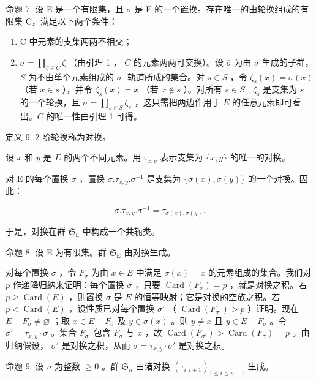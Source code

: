 命题 7. 设 E 是一个有限集，且 \(\sigma\) 是 E 的一个置换。存在唯一的由轮换组成的有限集 C，满足以下两个条件：

\begin{enumerate}
\def\labelenumi{(\alph{enumi})}
\item
  C 中元素的支集两两不相交；
\item
  \(\sigma = \prod_{\zeta \in C} \zeta\) （由引理 1 ， \(C\) 的元素两两可交换）。设 \(\bar{\sigma}\) 为由 \(\sigma\) 生成的子群， \(S\) 为不由单个元素组成的 \(\bar{\sigma}\) -轨道所成的集合。对 \(s \in S\) ，令 \(\zeta_s(x) = \sigma(x)\) （若 \(x \in s\) ），并令 \(\zeta_s(x) = x\) （若 \(x \notin s\) ）。对所有 \(s \in S\) , \(\zeta_s\) 是支集为 \(s\) 的一个轮换，且 \(\sigma = \prod_{s \in S} \zeta_s\) ，这只需把两边作用于 \(E\) 的任意元素即可看出。\(C\) 的唯一性由引理 1 可得。
\end{enumerate}

定义 9. 2 阶轮换称为对换。

设 \(x\) 和 \(y\) 是 \(E\) 的两个不同元素。用 \(\tau_{x,y}\) 表示支集为 \(\{x, y\}\) 的唯一的对换。

对 E 的每个置换 \(\sigma\) ，置换 \(\sigma. \tau_{x,y}. \sigma^{-1}\) 是支集为 \(\{\sigma(x), \sigma(y)\}\) 的一个对换。因此：

\[
\sigma . \tau_ {x, y}. \sigma^ {- 1} = \tau_ {\sigma (x), \sigma (y)}.\tag{4}
\]

于是，对换在群 \(\mathfrak{S}_{\mathbb{E}}\) 中构成一个共轭类。

命题 8. 设 E 为有限集。群 \(\mathfrak{S}_{\mathrm{E}}\) 由对换生成。

对每个置换 \(\sigma\) ，令 \(F_{\sigma}\) 为由 \(x \in E\) 中满足 \(\sigma(x) = x\) 的元素组成的集合。我们对 \(p\) 作递降归纳来证明：每个置换 \(\sigma\) ，只要 \(\operatorname{Card}(F_{\sigma}) = p\) ，就是对换之积。若 \(p \geqslant \operatorname{Card}(E)\) ，则置换 \(\sigma\) 是 \(E\) 的恒等映射；它是对换的空族之积。若 \(p < \operatorname{Card}(E)\) ，设性质已对每个置换 \(\sigma'\) （ \(\operatorname{Card}(F_{\sigma'}) > p\) ）证明。现在 \(E - F_{\sigma} \neq \varnothing\) ；取 \(x \in E - F_{\sigma}\) 及 \(y \in \sigma(x)\) 。则 \(y \neq x\) 且 \(y \in E - F_{\sigma}\) 。令 \(\sigma' = \tau_{x,y} \cdot \sigma\) 。集合 \(F_{\sigma'}\) 包含 \(F_{\sigma}\) 与 \(x\) ，故 \(\operatorname{Card}(F_{\sigma'}) > \operatorname{Card}(F_{\sigma}) = p\) 。由归纳假设， \(\sigma'\) 是对换之积，从而 \(\sigma = \tau_{x,y} \cdot \sigma'\) 是对换之积。

命题 9. 设 \(n\) 为整数 \(\geqslant 0\) 。群 \(\mathfrak{S}_n\) 由诸对换 \((\tau_{i,i+1})_{1\leqslant i\leqslant n-1}\) 生成。

